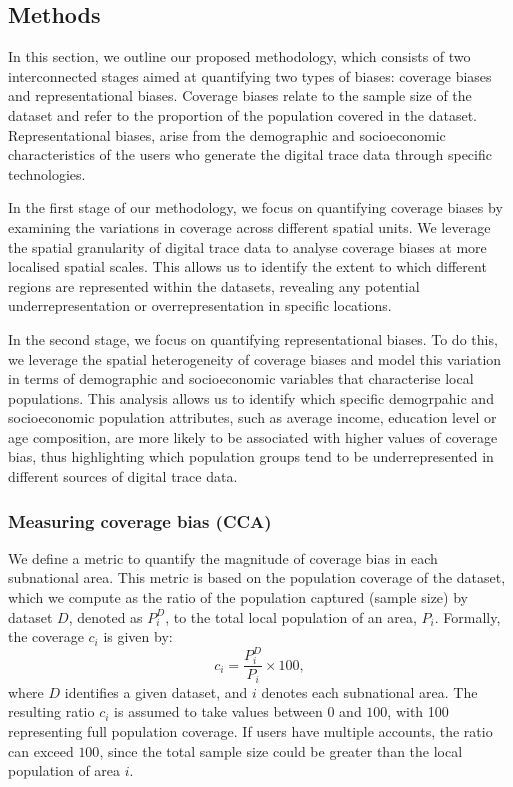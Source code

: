 \documentclass[]{rsos}%
\begin{document}
\hypertarget{methods}{%
\subsection{Methods}\label{methods}}

In this section, we outline our proposed methodology, which consists of
two interconnected stages aimed at quantifying two types of biases:
coverage biases and representational biases. Coverage biases relate to
the sample size of the dataset and refer to the proportion of the
population covered in the dataset. Representational biases, arise from
the demographic and socioeconomic characteristics of the users who
generate the digital trace data through specific technologies.

In the first stage of our methodology, we focus on quantifying coverage
biases by examining the variations in coverage across different spatial
units. We leverage the spatial granularity of digital trace data to
analyse coverage biases at more localised spatial scales. This allows us
to identify the extent to which different regions are represented within
the datasets, revealing any potential underrepresentation or
overrepresentation in specific locations.

In the second stage, we focus on quantifying representational biases. To
do this, we leverage the spatial heterogeneity of coverage biases and
model this variation in terms of demographic and socioeconomic variables
that characterise local populations. This analysis allows us to identify
which specific demogrpahic and socioeconomic population attributes, such
as average income, education level or age composition, are more likely
to be associated with higher values of coverage bias, thus highlighting
which population groups tend to be underrepresented in different sources
of digital trace data.

\hypertarget{measuring-coverage-bias-cca}{%
\subsubsection{Measuring coverage bias (CCA)}\label{measuring-coverage-bias-cca}}

We define a metric to quantify the magnitude of coverage bias in each
subnational area. This metric is based on the population coverage of the
dataset, which we compute as the ratio of the population captured
(sample size) by dataset \(D\), denoted as \(P_i^D\), to the total local
population of an area, \(P_i\). Formally, the coverage \(c_i\) is given by:
\begin{equation}
c_i = \dfrac{P_i^D}{P_i} \times 100,
\end{equation} where \(D\) identifies a given dataset, and \(i\) denotes
each subnational area. The resulting ratio \(c_i\) is assumed to take
values between \(0\) and \(100\), with 100 representing full population
coverage. If users have multiple accounts, the ratio can exceed \(100\),
since the total sample size could be greater than the local population
of area \(i\).
\end{document}
